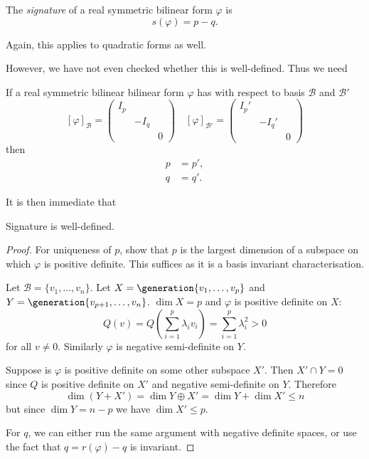 \documentclass[a4paper]{article}
\newcommand*{\spans}{\generation}
\newcommand*{\basis}{\mathcal}
\theoremstyle{definition}
\begin{document}
\begin{definition}[Signature]
  The \emph{signature} of a real symmetric bilinear form \(\varphi\) is
  \[
    s(\varphi) = p - q.
  \]
\end{definition}

Again, this applies to quadratic forms as well.

However, we have not even checked whether this is well-defined. Thus we need

\begin{theorem}
  If a real symmetric bilinear bilinear form \(\varphi\) has with respect to basis \(\basis B\) and \(\basis B'\)
  \[
    [\varphi]_{\basis B} =
    \begin{pmatrix}
      I_p & & \\
      & -I_q & \\
      & & 0
    \end{pmatrix}
    \quad
    [\varphi]_{\basis B'} =
    \begin{pmatrix}
      I_p' & & \\
      & -I_q' & \\
      & & 0
    \end{pmatrix}
  \]
  then
  \begin{align*}
    p &= p', \\
    q &= q'.
  \end{align*}
\end{theorem}

It is then immediate that

\begin{corollary}
  Signature is well-defined.
\end{corollary}

\begin{proof}
  For uniqueness of \(p\), show that \(p\) is the largest dimension of a subspace on which \(\varphi\) is positive definite. This suffices as it is a basis invariant characterisation.

  Let \(\basis B = \{v_1, \dots, v_n\}\). Let \(X = \spans{v_1, \dots, v_p}\) and \(Y = \spans{v_{p + 1}, \dots, v_n}\). \(\dim X = p\) and \(\varphi\) is positive definite on \(X\):
  \[
    Q(v) = Q \left( \sum_{i = 1}^{p} \lambda_i v_i \right) = \sum_{i = 1}^{p} \lambda_i^2 > 0
  \]
  for all \(v \neq 0\). Similarly \(\varphi\) is negative semi-definite on \(Y\).

  Suppose is \(\varphi\) is positive definite on some other subspace \(X'\). Then \(X' \cap Y = 0\) since \(Q\) is positive definite on \(X'\) and negative semi-definite on \(Y\). Therefore
  \[
    \dim (Y + X') = \dim Y \oplus X' = \dim Y + \dim X' \leq n
  \]
  but since \(\dim Y = n - p\) we have \(\dim X' \leq p\).

  For \(q\), we can either run the same argument with negative definite spaces, or use the fact that \(q = r(\varphi) - q\) is invariant.
\end{proof}
\end{document}
